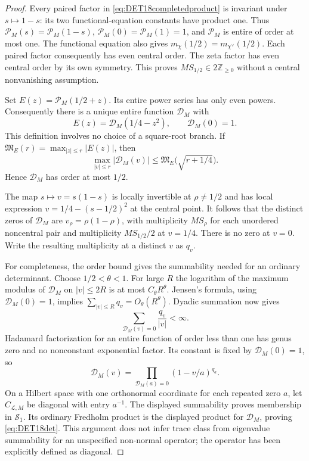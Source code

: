 \documentclass[11pt,a4paper]{article}
\begin{document}
\begin{proof}
Every paired factor in \eqref{eq:DET18completedproduct} is invariant
under $s\mapsto1-s$: its two functional-equation constants have product
one. Thus $\mathscr P_M(s)=\mathscr P_M(1-s)$,
$\mathscr P_M(0)=\mathscr P_M(1)=1$, and $\mathscr P_M$ is entire of
order at most one. The functional equation also gives
$m_{\chi}(1/2)=m_{\chi^\vee}(1/2)$. Each paired factor consequently
has even central order. The zeta factor has even central order by its
own symmetry. This proves $MS_{1/2}\in2\mathbb Z_{\ge0}$ without a
central nonvanishing assumption.

Set $E(z)=\mathscr P_M(1/2+z)$. Its entire power series has only even
powers. Consequently there is a unique entire function $\mathscr D_M$
with
\[
 E(z)=\mathscr D_M(1/4-z^2),\qquad \mathscr D_M(0)=1.
\]
This definition involves no choice of a square-root branch. If
$\mathfrak M_E(r)=\max_{|z|\le r}|E(z)|$, then
\[
 \max_{|v|\le r}|\mathscr D_M(v)|
 \le \mathfrak M_E\bigl(\sqrt{r+1/4}\bigr).
\]
Hence $\mathscr D_M$ has order at most $1/2$.

The map $s\mapsto v=s(1-s)$ is locally invertible at
$\rho\ne1/2$ and has local expression $v=1/4-(s-1/2)^2$ at the
central point. It follows that the distinct zeros of $\mathscr D_M$
are $v_\rho=\rho(1-\rho)$, with multiplicity $MS_\rho$ for each
unordered noncentral pair and multiplicity $MS_{1/2}/2$ at $v=1/4$.
There is no zero at $v=0$. Write the resulting multiplicity at a
distinct $v$ as $q_v$.

For completeness, the order bound gives the summability needed for an
ordinary determinant. Choose $1/2<\theta<1$. For large $R$ the
logarithm of the maximum modulus of $\mathscr D_M$ on $|v|\le2R$
is at most $C_\theta R^\theta$. Jensen's formula, using
$\mathscr D_M(0)=1$, implies
$\sum_{|v|\le R}q_v=O_\theta(R^\theta)$.
Dyadic summation now gives
\[
 \sum_{\mathscr D_M(v)=0}\frac{q_v}{|v|}<\infty.
\]
Hadamard factorization for an entire function of order less than one
has genus zero and no nonconstant exponential factor. Its constant
is fixed by $\mathscr D_M(0)=1$, so
\[
 \mathscr D_M(v)=\prod_{\mathscr D_M(a)=0}
 (1-v/a)^{q_a}.
\]
On a Hilbert space with one orthonormal coordinate for each repeated
zero $a$, let $C_{\mathcal L,M}$ be diagonal with entry $a^{-1}$.
The displayed summability proves membership in $\mathcal S_1$.
Its ordinary Fredholm product is the displayed product for
$\mathscr D_M$, proving \eqref{eq:DET18det}. This argument does not
infer trace class from eigenvalue summability for an unspecified
non-normal operator; the operator has been explicitly defined as
diagonal.


\end{proof}
\end{document}
